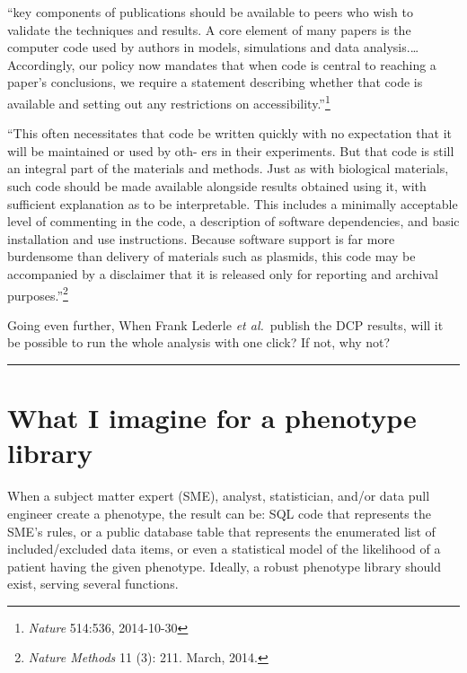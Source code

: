 \documentclass{tufte-handout}
\begin{document}
``key components of publications should be available to peers who wish
to validate the techniques and results. A core element of many papers
is the computer code used by authors in models, simulations and data
analysis.\ldots{} Accordingly, our policy now mandates that when code
is central to reaching a paper's conclusions, we require a statement
describing whether that code is available and setting out any
restrictions on accessibility.''\footnote{\emph{Nature} 514:536,
  2014-10-30}

``This often necessitates that code be written quickly with no
expectation that it will be maintained or used by oth- ers in their
experiments. But that code is still an integral part of the materials
and methods. Just as with biological materials, such code should be
made available alongside results obtained using it, with sufficient
explanation as to be interpretable. This includes a minimally
acceptable level of commenting in the code, a description of software
dependencies, and basic installation and use instructions. Because
software support is far more burdensome than delivery of materials
such as plasmids, this code may be accompanied by a disclaimer that it
is released only for reporting and archival
purposes.''\footnote{\emph{Nature Methods} 11 (3): 211. March, 2014.}

Going even further, When Frank Lederle \emph{et al.}\ publish the DCP
results, will it be possible to run the whole analysis with one click?
If not, why not?

\noindent \rule{\textwidth}{1pt}

\section{What I imagine for a phenotype library}

When a subject matter expert (SME), analyst, statistician, and/or data
pull engineer create a phenotype, the result can be: SQL code that
represents the SME's rules, or a public database table that represents
the enumerated list of included/excluded data items, or even a
statistical model of the likelihood of a patient having the given
phenotype. Ideally, a robust phenotype library should exist, serving
several functions.
\end{document}
